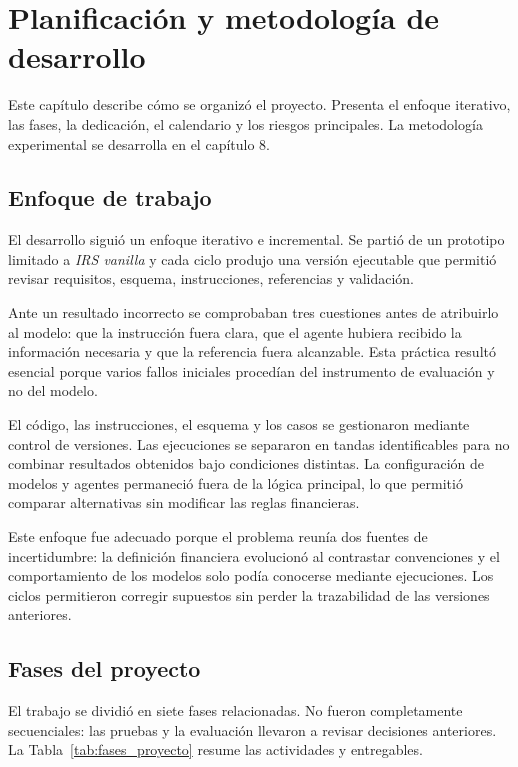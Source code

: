 \chapter{Planificación y metodología de desarrollo}
\label{cap:planificacion}

Este capítulo describe cómo se organizó el proyecto. Presenta el enfoque iterativo, las fases, la dedicación, el calendario y los riesgos principales. La metodología experimental se desarrolla en el capítulo 8.

\section{Enfoque de trabajo}
\label{sec:enfoque_trabajo}

El desarrollo siguió un enfoque iterativo e incremental. Se partió de un prototipo limitado a \textit{IRS vanilla} y cada ciclo produjo una versión ejecutable que permitió revisar requisitos, esquema, instrucciones, referencias y validación.

Ante un resultado incorrecto se comprobaban tres cuestiones antes de atribuirlo al modelo: que la instrucción fuera clara, que el agente hubiera recibido la información necesaria y que la referencia fuera alcanzable. Esta práctica resultó esencial porque varios fallos iniciales procedían del instrumento de evaluación y no del modelo.

El código, las instrucciones, el esquema y los casos se gestionaron mediante control de versiones. Las ejecuciones se separaron en tandas identificables para no combinar resultados obtenidos bajo condiciones distintas. La configuración de modelos y agentes permaneció fuera de la lógica principal, lo que permitió comparar alternativas sin modificar las reglas financieras.

Este enfoque fue adecuado porque el problema reunía dos fuentes de incertidumbre: la definición financiera evolucionó al contrastar convenciones y el comportamiento de los modelos solo podía conocerse mediante ejecuciones. Los ciclos permitieron corregir supuestos sin perder la trazabilidad de las versiones anteriores.

\section{Fases del proyecto}
\label{sec:fases_proyecto}

El trabajo se dividió en siete fases relacionadas. No fueron completamente secuenciales: las pruebas y la evaluación llevaron a revisar decisiones anteriores. La Tabla~\ref{tab:fases_proyecto} resume las actividades y entregables.

